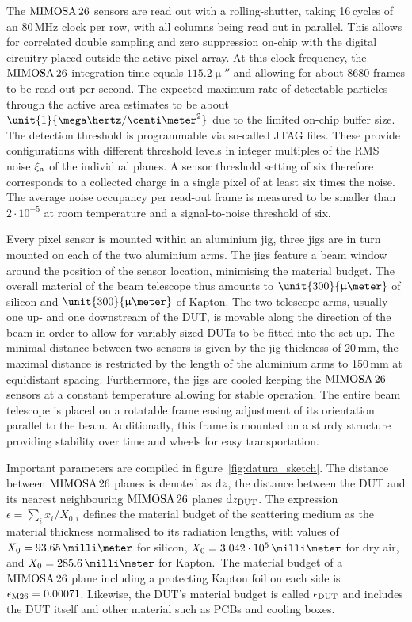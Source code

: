 The $\textrm{MIMOSA\,26}$ sensors are read out with a rolling-shutter, taking 16\,cycles of an 80\,MHz clock per row, with all columns being read out in parallel. 
This allows for correlated double sampling and zero suppression on-chip with the digital circuitry placed outside the active pixel array. 
At this clock frequency, the $\textrm{MIMOSA\,26}$ integration time equals $\unit{115.2}{\upmu\second}$ and allowing for about 8680 frames to be read out per second. 
The expected maximum rate of detectable particles through the active area estimates to be about $\unit{1}{\mega\hertz/\centi\meter^2}$ due to the limited on-chip buffer size. 
The detection threshold is programmable via so-called JTAG files. 
These provide configurations with different threshold levels in integer multiples of the RMS noise $\xi_{\textrm{n}}$ of the individual planes. 
A sensor threshold setting of six therefore corresponds to a collected charge in a single pixel of at least six times the noise. 
The average noise occupancy per read-out frame is measured to be smaller than $2\cdot10^{-5}$ at room temperature and a signal-to-noise threshold of six.

Every pixel sensor is mounted within an aluminium jig, three jigs are in turn mounted on each of the two aluminium arms. 
The jigs feature a beam window around the position of the sensor location, minimising the material budget. 
The overall material of the beam telescope thus amounts to $\unit{300}{\upmu\meter}$ of silicon and $\unit{300}{\upmu\meter}$ of Kapton. 
The two telescope arms, usually one up- and one downstream of the DUT, is movable along the direction of the beam in order to allow for variably sized DUTs to be fitted into the set-up. 
The minimal distance between two sensors is given by the jig thickness of 20\,mm, the maximal distance is restricted by the length of the aluminium arms to 150\,mm at equidistant spacing.
Furthermore, the jigs are cooled keeping the $\textrm{MIMOSA\,26}$ sensors at a constant temperature allowing for stable operation.
The entire beam telescope is placed on a rotatable frame easing adjustment of its orientation parallel to the beam. 
Additionally, this frame is mounted on a sturdy structure providing stability over time and wheels for easy transportation. 

Important parameters are compiled in figure~\ref{fig:datura_sketch}. 
The distance between $\textrm{MIMOSA\,26}$ planes is denoted as $\textrm{d}z$, the distance between the DUT and its nearest neighbouring $\textrm{MIMOSA\,26}$ planes $\textrm{d}z_{\textrm{DUT}}$. 
The expression $\epsilon = \sum_i x_{i}/X_{0,i}$ defines the material budget of the scattering medium as the material thickness normalised to its radiation lengths,
 with values of $X_0 = 93.65\,\milli\meter$ for silicon, $X_0 = 3.042\cdot 10^{5}\,\milli\meter$ for dry air, and $X_0 = 285.6\,\milli\meter$ for Kapton.\,\cite{ref:x0values}
The material budget of a $\textrm{MIMOSA\,26}$ plane including a protecting Kapton foil on each side is $\mathnormal{\epsilon_{\textrm{M26}}} = 0.00071$. 
Likewise, the DUT's material budget is called $\mathnormal{\epsilon_{\textrm{DUT}}}$ and includes the DUT itself and other material such as PCBs and cooling boxes.


